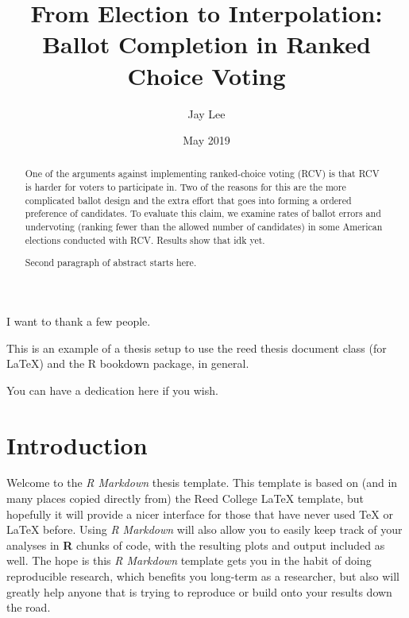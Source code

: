 \documentclass[12pt,twoside]{reedthesis}
\title{From Election to Interpolation: Ballot Completion in Ranked Choice
Voting}
\author{Jay Lee}
\date{May 2019}
\theoremstyle{definition}
\theoremstyle{definition}
\theoremstyle{definition}
\theoremstyle{remark}
\begin{document}
  \maketitle

\frontmatter %
\pagestyle{empty} %
  \begin{acknowledgements}
    I want to thank a few people.
  \end{acknowledgements}
  \begin{preface}
    This is an example of a thesis setup to use the reed thesis document
    class (for LaTeX) and the R bookdown package, in general.
  \end{preface}
  \hypersetup{linkcolor=black}
  \setcounter{tocdepth}{2}
  \tableofcontents

  \listoftables

  \listoffigures
  \begin{abstract}
    One of the arguments against implementing ranked-choice voting (RCV) is
    that RCV is harder for voters to participate in. Two of the reasons for
    this are the more complicated ballot design and the extra effort that
    goes into forming a ordered preference of candidates. To evaluate this
    claim, we examine rates of ballot errors and undervoting (ranking fewer
    than the allowed number of candidates) in some American elections
    conducted with RCV. Results show that idk yet.
    
    \par
    
    Second paragraph of abstract starts here.
  \end{abstract}
  \begin{dedication}
    You can have a dedication here if you wish.
  \end{dedication}
\mainmatter %
\pagestyle{fancyplain} %

\hypertarget{introduction}{%
\chapter*{Introduction}\label{introduction}}

Welcome to the \emph{R Markdown} thesis template. This template is based
on (and in many places copied directly from) the Reed College LaTeX
template, but hopefully it will provide a nicer interface for those that
have never used TeX or LaTeX before. Using \emph{R Markdown} will also
allow you to easily keep track of your analyses in \textbf{R} chunks of
code, with the resulting plots and output included as well. The hope is
this \emph{R Markdown} template gets you in the habit of doing
reproducible research, which benefits you long-term as a researcher, but
also will greatly help anyone that is trying to reproduce or build onto
your results down the road.
\end{document}
